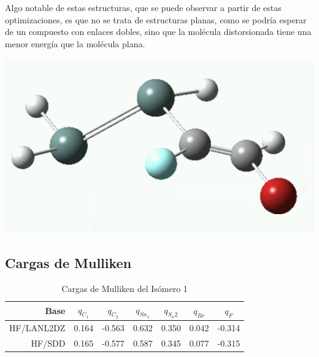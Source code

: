 \documentclass[12pt]{article}
\begin{document}
Algo notable de estas estructuras, que se puede observar a partir de estas optimizaciones, es que no se trata de estructuras planas, como se podría esperar de un compuesto con enlaces dobles, sino que la molécula distorsionada tiene una menor energía que la molécula plana. \cite{marquez_sn2h4} 

\begin{center}
    \includegraphics[height=0.30\textwidth]{3d.png}
\end{center}








\newpage
\subsection{Cargas de Mulliken}

\begin{table}[H]
\centering
    \begin{tabular}{rcccccc}
        \hline
        Base & $q_{C_1}$ & $q_{C_2}$ & $q_{Sn_1}$ & $q_{S_n2}$ & $q_{Br}$ & $q_{F}$ \\
        \hline
        HF/LANL2DZ  & 0.164 & -0.563 & 0.632 & 0.350 & 0.042 & -0.314 \\
        HF/SDD      & 0.165 & -0.577 & 0.587 & 0.345 & 0.077 & -0.315 \\
        \hline
    \end{tabular}
    \caption{Cargas de Mulliken del Isómero 1}
\end{table}
\end{document}

